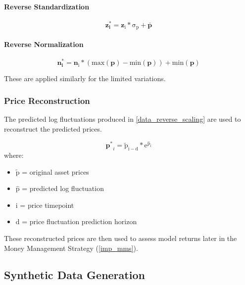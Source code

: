 \documentclass[a4paper,11pt,oneside]{article}
\theoremstyle{plain}
\theoremstyle{definition}
\begin{document}
	\paragraph{Reverse Standardization}
	
	\begin{equation}
	\mathbf{z^{*}_i} = \mathrm{{\mathbf{z}_i} * \sigma_p + \mathbf{\bar{p}}}
	\end{equation}
	
	\paragraph{Reverse Normalization}
	
	\begin{equation}
	\mathbf{n^{*}_i} = \mathrm{\mathbf{n}_i * (max(\mathbf{p}) - min(\mathbf{p})) + min(\mathbf{p})}
	\end{equation}
	
	These are applied similarly for the limited variations.
	
	\subsubsection{Price Reconstruction}\label{data_price_recon}
	
	The predicted log fluctuations produced in \ref{data_reverse_scaling} are used to reconstruct the predicted prices. 
	
	\begin{equation}
	\mathbf{p^*}_{i} = \mathrm{\tilde{p}_{i-d} * e^{\hat{p}_{i}}}
	\end{equation}
	where:
	\begin{itemize}
		\item [] $\mathrm{\tilde{p}}$ = original asset prices
		\item [] $\mathrm{\hat{p}}$ = predicted log fluctuation 
		\item [] $\mathrm{i}$ = price timepoint 
		\item [] $\mathrm{d}$ = price fluctuation prediction horizon
		
	\end{itemize}
	\texttt{}\newline
	These reconstructed prices are then used to assess model returns later in the Money Management Strategy (\ref{imp_mms}).
	
	\subsection{Synthetic Data Generation}\label{data_synthetic}
	
\end{document}
